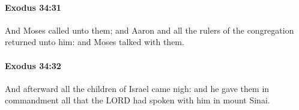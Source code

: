 		\paragraph{Exodus 34:31} %
			\label{EXODUS-34-31}

			And Moses called unto them; and Aaron and all the rulers of the congregation returned unto him: and Moses talked with them.


		\paragraph{Exodus 34:32} %
			\label{EXODUS-34-32}

			And afterward all the children of Israel came nigh: and he gave them in commandment all that the LORD had spoken with him in mount Sinai.


